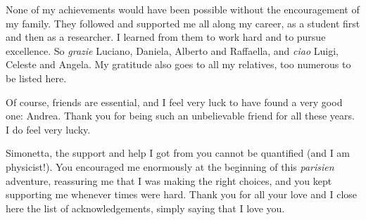 None of my achievements would have been possible without the encouragement of my family. 
They followed and supported 
me all along my career, as a student first and then as a researcher. I learned from them to work hard 
and to pursue excellence. So {\it grazie} Luciano, Daniela, Alberto and Raffaella, and {\it ciao} Luigi, Celeste 
and Angela. My gratitude also goes to all my relatives, too numerous to be listed here.

Of course, friends are essential, and I feel very luck to have found a very good one: Andrea. Thank you 
for being such an unbelievable friend for all these years. I do feel very lucky. 


Simonetta, the support and help I got from you cannot be quantified (and I am physicist!).  You encouraged 
me enormously at the beginning of this {\it parisien} adventure,  reassuring me that I was making the right 
choices, and you kept supporting me whenever times were hard. Thank you for all your love and  I close here 
the list of acknowledgements, simply saying that I love you.











